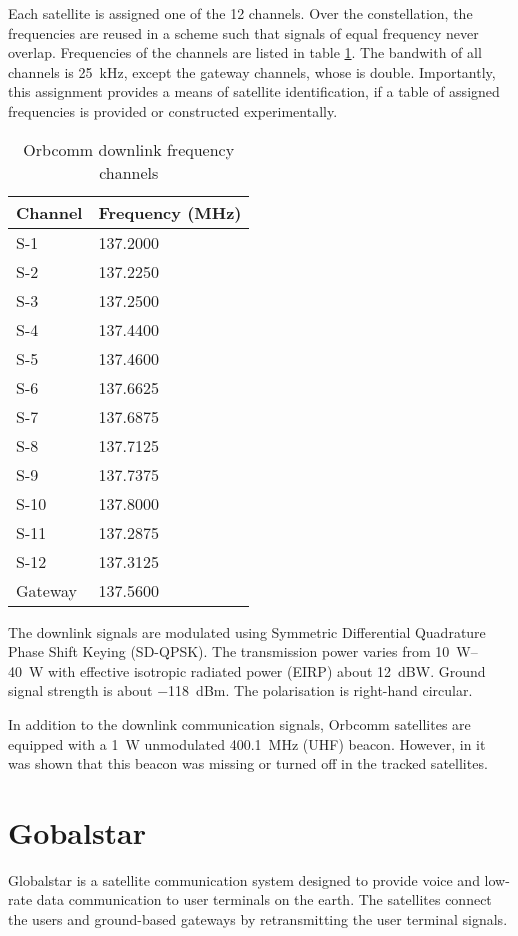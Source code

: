 Each satellite is assigned one of the 12 channels. Over the constellation, the frequencies are reused in a scheme such that signals of equal frequency never overlap. Frequencies of the channels are listed in table \ref{t_sat_orbcomm_channels}. The bandwith of all channels is \qty{25}{kHz}, except the gateway channels, whose is double\cite{sat13}. Importantly, this assignment provides a means of satellite identification, if a table of assigned frequencies is provided or constructed experimentally.

\begin{table}
\caption{Orbcomm downlink frequency channels\cite{sat13}}
\label{t_sat_orbcomm_channels}
\begin{tabular}{ll}
Channel & Frequency (MHz) \\ \hline
S-1     & 137.2000        \\
S-2     & 137.2250        \\
S-3     & 137.2500        \\
S-4     & 137.4400        \\
S-5     & 137.4600        \\
S-6     & 137.6625        \\
S-7     & 137.6875        \\
S-8     & 137.7125        \\
S-9     & 137.7375        \\
S-10    & 137.8000        \\
S-11    & 137.2875        \\
S-12    & 137.3125        \\
Gateway & 137.5600       
\end{tabular}
\end{table}

The downlink signals are modulated using Symmetric Differential Quadrature Phase Shift Keying (SD-QPSK). The transmission power varies from \qtyrange{10}{40}{W} with effective isotropic radiated power (EIRP) about \qty{12}{dBW}. Ground signal strength is about \qty{-118}{dBm}. The polarisation is right-hand circular\cite{sop08, sat11}.

In addition to the downlink communication signals, Orbcomm satellites are equipped with a \qty{1}{W} unmodulated \qty{400.1}{MHz} (UHF) beacon\cite{sat13}. However, in \cite{sop08} it was shown that this beacon was missing or turned off in the tracked satellites.

\section{Gobalstar}
Globalstar is a satellite communication system designed to provide voice and low-rate data communication to user terminals on the earth. The satellites connect the users and ground-based gateways by retransmitting the user terminal signals\cite{sop07, sat14}.

